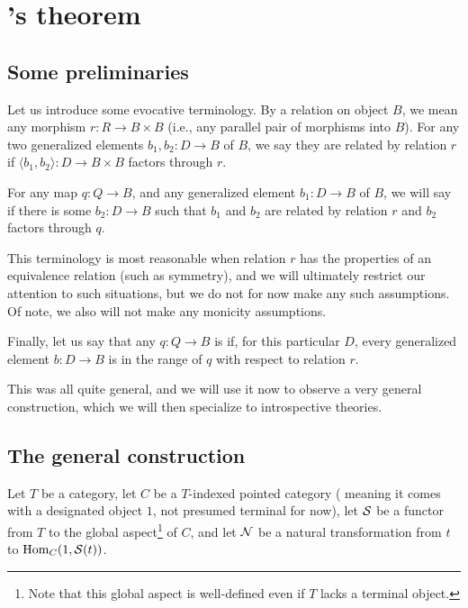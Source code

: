 \section{\Loeb's theorem}

\subsection{Some preliminaries}

Let us introduce some evocative terminology. By a relation on object $B$, we mean any morphism $r : R \to B \times B$ (i.e., any parallel pair of morphisms into $B$). For any two generalized elements $b_1, b_2 : D \to B$ of $B$, we say they are related by relation $r$ if $\langle b_1, b_2 \rangle : D \to B \times B$ factors through $r$.

For any map $q: Q \to B$, and any generalized element $b_1 : D \to B$ of $B$, we will say  if there is some $b_2 : D \to B$ such that $b_1$ and $b_2$ are related by relation $r$ and $b_2$ factors through $q$.

This terminology is most reasonable when relation $r$ has the properties of an equivalence relation (such as symmetry), and we will ultimately restrict our attention to such situations, but we do not for now make any such assumptions. Of note, we also will not make any monicity assumptions.

Finally, let us say that any $q : Q \to B$ is  if, for this particular $D$, every generalized element $b : D \to B$ is in the range of $q$ with respect to relation $r$.

This was all quite general, and we will use it now to observe a very general construction, which we will then specialize to introspective theories.

\subsection{The general construction}
\begin{construction}\label{GeneralDiag}
\end{construction}
Let $T$ be a category, let $C$ be a $T$-indexed pointed category ( meaning it comes with a designated object $1$, not presumed terminal for now), let $\mathcal{S}$ be a functor from $T$ to the global aspect\footnote{Note that this global aspect is well-defined even if $T$ lacks a terminal object.} of $C$, and let $\mathcal{N}$ be a natural transformation from $t$ to $\operatorname{Hom}_C(1, \mathcal{S}(t))$.


